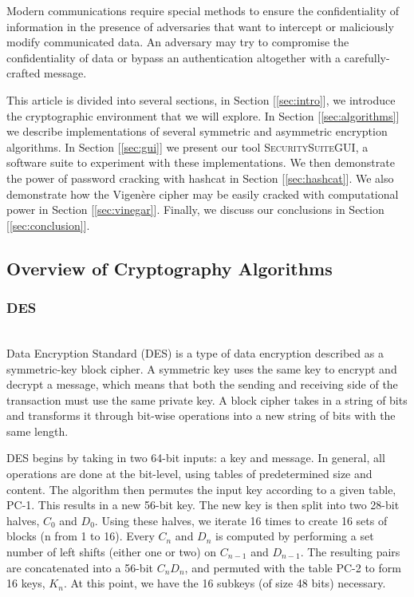 \documentclass[acmlarge]{acmart}
\begin{document}
Modern communications require special methods to ensure the confidentiality of information in the presence of adversaries that want to intercept or maliciously modify communicated data. An adversary may try to compromise the confidentiality of data or bypass an authentication altogether with a carefully-crafted message.

This article is divided into several sections, in Section [\ref{sec:intro}], we introduce the cryptographic environment that we will explore. In Section [\ref{sec:algorithms}] we describe implementations of several symmetric and asymmetric encryption algorithms. In Section [\ref{sec:gui}] we present our tool \textsc{SecuritySuiteGUI}, a software suite to experiment with these implementations. We then demonstrate the power of password cracking with hashcat in Section [\ref{sec:hashcat}]. We also demonstrate how the Vigen\`{e}re cipher may be easily cracked with computational power in Section [\ref{sec:vinegar}]. Finally, we discuss our conclusions in Section [\ref{sec:conclusion}].

\subsection{Overview of Cryptography Algorithms}
\subsubsection{DES}
\hspace*{\fill} \\ %
Data Encryption Standard (DES) is a type of data encryption described as a symmetric-key block cipher. A symmetric key uses the same key to encrypt and decrypt a message, which means that both the sending and receiving side of the transaction must use the same private key. A block cipher takes in a string of bits and transforms it through bit-wise operations into a new string of bits with the same length. 

DES begins by taking in two 64-bit inputs: a key and message. In general, all operations are done at the bit-level, using tables of predetermined size and content. The algorithm then permutes the input key according to a given table, PC-1. This results in a new 56-bit key. The new key is then split into two 28-bit halves, $C_{0}$ and $D_{0}$. Using these halves, we iterate 16 times to create 16 sets of blocks (n from 1 to 16). Every $C_{n}$ and  $D_{n}$ is computed by performing a set number of left shifts (either one or two) on $C_{n-1}$ and $D_{n-1}$.
 The resulting pairs are concatenated into a 56-bit $C_{n}D_{n}$, and permuted with the table PC-2 to form 16 keys, $K_{n}$. At this point, we have the 16 subkeys (of size 48 bits) necessary. 
\end{document}
